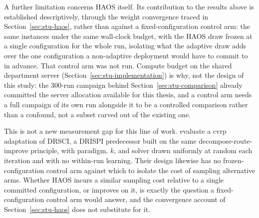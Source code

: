 A further limitation concerns HAOS itself. Its contribution to the results above is established descriptively, through the weight convergence traced in Section~\ref{sec:stu-haos}, rather than against a fixed-configuration control arm: the same instances under the same wall-clock budget, with the HAOS draw frozen at a single configuration for the whole run, isolating what the adaptive draw adds over the one configuration a non-adaptive deployment would have to commit to in advance. That control arm was not run. Compute budget on the shared department server (Section~\ref{sec:stu-implementation}) is why, not the design of this study: the 300-run campaign behind Section~\ref{sec:stu-comparison} already committed the server allocation available for this thesis, and a control arm needs a full campaign of its own run alongside it to be a controlled comparison rather than a confound, not a subset carved out of the existing one.

This is not a new measurement gap for this line of work. \citet{altendeiteringDRSCICVRP2026} evaluate a \gls{cvrp} adaptation of DRSCI, a DRISPI predecessor built on the same decompose-route-improve principle, with paradigm, $k$, and solver drawn uniformly at random each iteration and with no within-run learning. Their design likewise has no frozen-configuration control arm against which to isolate the cost of sampling alternative arms. Whether HAOS incurs a similar sampling cost relative to a single committed configuration, or improves on it, is exactly the question a fixed-configuration control arm would answer, and the convergence account of Section~\ref{sec:stu-haos} does not substitute for it.